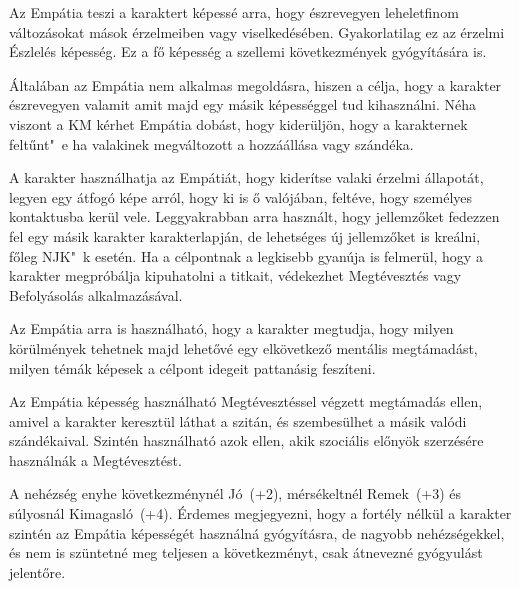 
Az Empátia teszi a karaktert képessé arra, hogy észrevegyen leheletfinom változásokat mások érzelmeiben vagy viselkedésében. Gyakorlatilag ez az érzelmi Észlelés képesség.
Ez a fő képesség a szellemi következmények gyógyítására is.

\overcome Általában az Empátia nem alkalmas megoldásra, hiszen a célja, hogy a karakter észrevegyen valamit amit majd egy másik képességgel tud kihasználni. Néha viszont a KM kérhet Empátia dobást, hogy kiderüljön, hogy a karakternek feltűnt"~e ha valakinek megváltozott a hozzáállása vagy szándéka.

\advantage A karakter használhatja az Empátiát, hogy kiderítse valaki érzelmi állapotát, legyen egy átfogó képe arról, hogy ki is ő valójában, feltéve, hogy személyes kontaktusba kerül vele. Leggyakrabban arra használt, hogy jellemzőket fedezzen fel egy másik karakter karakterlapján, de lehetséges új jellemzőket is kreálni, főleg NJK"~k esetén. Ha a célpontnak a legkisebb gyanúja is felmerül, hogy a karakter megpróbálja kipuhatolni a titkait, védekezhet Megtévesztés vagy Befolyásolás alkalmazásával.

Az Empátia arra is használható, hogy a karakter megtudja, hogy milyen körülmények tehetnek majd lehetővé egy elkövetkező mentális megtámadást, milyen témák képesek a célpont idegeit pattanásig feszíteni.

\noattackatall

 Az Empátia képesség használható Megtévesztéssel végzett megtámadás ellen, amivel a karakter keresztül láthat a szitán, és szembesülhet a másik valódi szándékaival. Szintén használható azok ellen, akik szociális előnyök szerzésére használnák a Megtévesztést.




A nehézség enyhe következménynél Jó~(+2), mérsékeltnél Remek~(+3) és súlyosnál Kimagasló~(+4). Érdemes megjegyezni, hogy a fortély nélkül a karakter szintén az Empátia képességét használná gyógyításra, de nagyobb nehézségekkel, és nem is szüntetné meg teljesen a következményt, csak átnevezné gyógyulást jelentőre.
